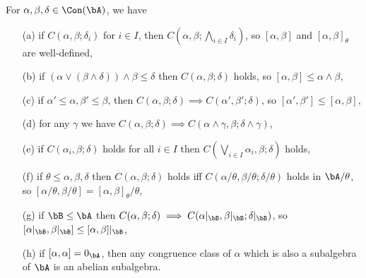 \begin{prop}\label{gen-commutator} For $\alpha,\beta,\delta \in \Con(\bA)$, we have
\begin{itemize}
\item[(a)] if $C(\alpha,\beta;\delta_i)$ for $i \in I$, then $C(\alpha,\beta;\bigwedge_{i\in I} \delta_i)$, so $[\alpha,\beta]$ and $[\alpha,\beta]_\theta$ are well-defined,

\item[(b)] if $(\alpha \vee (\beta \wedge \delta)) \wedge \beta \le \delta$ then $C(\alpha, \beta; \delta)$ holds, so $[\alpha,\beta] \le \alpha \wedge \beta$,

\item[(c)] if $\alpha' \le \alpha, \beta' \le \beta$, then $C(\alpha,\beta;\delta) \implies C(\alpha',\beta';\delta)$, so $[\alpha',\beta'] \le [\alpha, \beta]$,

\item[(d)] for any $\gamma$ we have $C(\alpha,\beta;\delta) \implies C(\alpha\wedge \gamma,\beta;\delta \wedge \gamma)$,

\item[(e)] if $C(\alpha_i,\beta;\delta)$ holds for all $i\in I$ then $C(\bigvee_{i \in I}\alpha_i,\beta;\delta)$ holds,

\item[(f)] if $\theta \le \alpha, \beta, \delta$ then $C(\alpha,\beta;\delta)$ holds iff $C(\alpha/\theta,\beta/\theta;\delta/\theta)$ holds in $\bA/\theta$, so $[\alpha/\theta,\beta/\theta] = [\alpha,\beta]_\theta/\theta$,

\item[(g)] if $\bB \le \bA$ then $C(\alpha,\beta;\delta) \implies C(\alpha|_\bB, \beta|_\bB; \delta|_\bB)$, so $[\alpha|_\bB,\beta|_\bB] \le [\alpha,\beta]|_\bB$,

\item[(h)] if $[\alpha,\alpha] = 0_\bA$, then any congruence class of $\alpha$ which is also a subalgebra of $\bA$ is an abelian subalgebra.
\end{itemize}
\end{prop}
